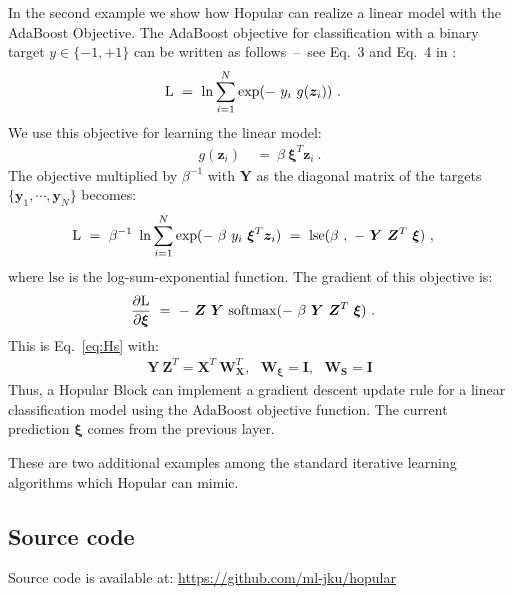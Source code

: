 \documentclass{article}
\theoremstyle{plain}
\theoremstyle{definition}
\theoremstyle{remark}
\newcommand\By{\bm{y}}
\newcommand\Bz{\bm{z}}
\newcommand\BI{\bm{I}}
\newcommand\BS{\bm{S}}
\newcommand\BW{\bm{W}}
\newcommand\BX{\bm{X}}
\newcommand\BY{\bm{Y}}
\newcommand\BZ{\bm{Z}}
\newcommand\Bxi{\bm{\xi}}
\newcommand{\soft}{\mathrm{softmax}}
\begin{document}
In the second example we show how Hopular can realize a linear model
with the AdaBoost Objective. The AdaBoost objective for classification
with a binary target $y \in \{ -1, +1 \}$ can be written as follows~\---{}~see Eq.~3 and Eq.~4 in \citep{Shen:10}:
\begin{align}
    \rL \ &= \  \ln \sum_{i=1}^{N}  \exp(- \ y_i \ g(\Bz_i) ) \ . 
\end{align}
We use this objective for learning the linear model:
\begin{align}
    g(\Bz_i) \ &= \ \beta \ \Bxi^T \Bz_i \ . 
\end{align}
The objective multiplied by $\beta^{-1}$ with $\BY$ as the diagonal matrix
of the targets $\{ \By_1, \cdots , \By_N \}$ becomes:
\begin{align}
  \rL \ &= \  \beta^{-1} \ \ln \sum_{i=1}^{N}  \exp(- \ \beta \ y_i \ \Bxi^T \Bz_i ) \ 
  = \ \mathrm{lse}(\beta \ , \ - \ \BY \ \BZ^T \  \Bxi)  \ , 
\end{align}
where $\mathrm{lse}$ is the log-sum-exponential function.
The gradient of this objective is:
\begin{align}
  \frac{\partial \rL}{\partial \Bxi} \ &= \  
  - \ \BZ \ \BY \ \soft( - \ \beta \ \BY \ \BZ^T \  \Bxi )  \ . 
\end{align}
This is Eq.~\ref{eq:Hs} with:
\begin{align}
    \BY \ \BZ^T = \BX^T \ \BW_{\BX}^T, \ \ \ \BW_{\Bxi} = \BI, \ \ \ \BW_{\BS} = \BI
\end{align}
Thus, a Hopular Block can implement a gradient descent update rule for a linear
classification model using the AdaBoost objective function. The current
prediction $\Bxi$ comes from the previous layer.

These are two additional examples among the standard iterative learning
algorithms which Hopular can mimic.

\subsection{Source code}
Source code is available at: \url{https://github.com/ml-jku/hopular}
\end{document}
